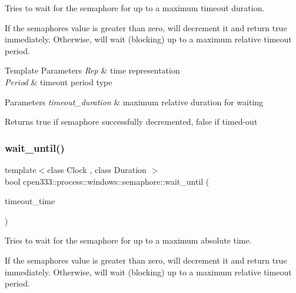 Tries to wait for the semaphore for up to a maximum timeout duration. 

If the semaphore\textquotesingle{}s value is greater than zero, will decrement it and return true immediately. Otherwise, will wait (blocking) up to a maximum relative timeout period.


\begin{DoxyTemplParams}{Template Parameters}
{\em Rep} & time representation \\
\hline
{\em Period} & timeout period type \\
\hline
\end{DoxyTemplParams}

\begin{DoxyParams}{Parameters}
{\em timeout\+\_\+duration} & maximum relative duration for waiting \\
\hline
\end{DoxyParams}
\begin{DoxyReturn}{Returns}
true if semaphore successfully decremented, false if timed-\/out 
\end{DoxyReturn}
\mbox{\label{classcpen333_1_1process_1_1windows_1_1semaphore_a2264a9d3557c6507b6c2e37599bd3f83}} 
\subsubsection{\texorpdfstring{wait\+\_\+until()}{wait\_until()}}
{\footnotesize\ttfamily template$<$class Clock , class Duration $>$ \\
bool cpen333\+::process\+::windows\+::semaphore\+::wait\+\_\+until (\begin{DoxyParamCaption}\item[{const std\+::chrono\+::time\+\_\+point$<$ Clock, Duration $>$ \&}]{timeout\+\_\+time }\end{DoxyParamCaption})\hspace{0.3cm}{\ttfamily [inline]}}



Tries to wait for the semaphore for up to a maximum absolute time. 

If the semaphore\textquotesingle{}s value is greater than zero, will decrement it and return true immediately. Otherwise, will wait (blocking) up to a maximum relative timeout period.


